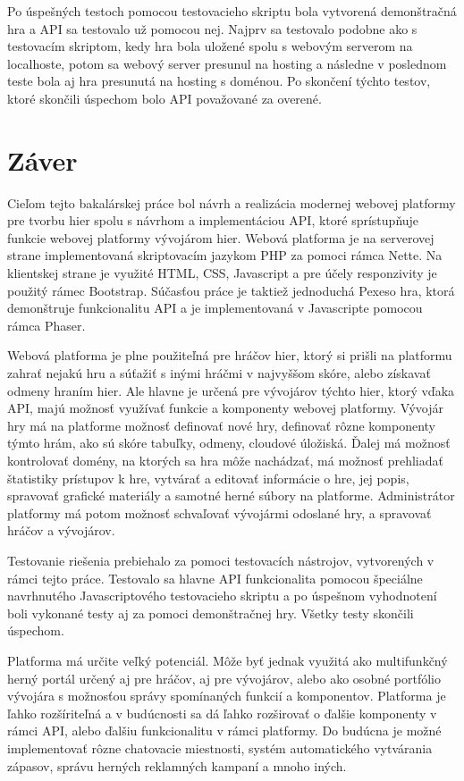 Po úspešných testoch pomocou testovacieho skriptu bola vytvorená demonštračná hra a API sa testovalo už pomocou nej. Najprv sa testovalo podobne ako s testovacím skriptom, kedy hra bola uložené spolu s webovým serverom na localhoste, potom sa webový server presunul na hosting a následne v poslednom teste bola aj hra presunutá na hosting s doménou. Po skončení týchto testov, ktoré skončili úspechom bolo API považované za overené. 

\chapter{Záver}
\label{chap:zaver}
Cieľom tejto bakalárskej práce bol návrh a realizácia modernej webovej platformy pre tvorbu hier spolu s návrhom a implementáciou API, ktoré sprístupňuje funkcie webovej platformy vývojárom hier. Webová platforma je na serverovej strane implementovaná skriptovacím jazykom PHP za pomoci rámca Nette. Na klientskej strane je využité HTML, CSS, Javascript a pre účely responzivity je použitý rámec Bootstrap. Súčasťou práce je taktiež jednoduchá Pexeso hra, ktorá demonštruje funkcionalitu API a je implementovaná v Javascripte pomocou rámca Phaser. 

Webová platforma je plne použiteľná pre hráčov hier, ktorý si prišli na platformu zahrať nejakú hru a súťažiť s inými hráčmi v najvyššom skóre, alebo získavať odmeny hraním hier. Ale hlavne je určená pre vývojárov týchto hier, ktorý vďaka API, majú možnosť využívať funkcie a komponenty webovej platformy. Vývojár hry má na platforme možnosť definovať nové hry, definovať rôzne komponenty týmto hrám, ako sú skóre tabuľky, odmeny, cloudové úložiská. Ďalej má možnosť kontrolovať domény, na ktorých sa hra môže nachádzať, má možnosť prehliadať štatistiky prístupov k hre, vytvárať a editovať informácie o hre, jej popis, spravovať grafické materiály a samotné herné súbory na platforme.  Administrátor platformy má potom možnosť schvaľovať vývojármi odoslané hry, a spravovať hráčov a vývojárov. 

Testovanie riešenia prebiehalo za pomoci testovacích nástrojov, vytvorených v rámci tejto práce. Testovalo sa hlavne API funkcionalita pomocou špeciálne navrhnutého Javascriptového testovacieho skriptu a po úspešnom vyhodnotení boli vykonané testy aj za pomoci demonštračnej hry. Všetky testy skončili úspechom.  

Platforma má určite veľký potenciál. Môže byť jednak využitá ako multifunkčný herný portál určený aj pre hráčov, aj pre vývojárov, alebo ako osobné portfólio vývojára s možnosťou správy spomínaných funkcií a komponentov. Platforma je ľahko rozšíriteľná a v budúcnosti sa dá ľahko rozširovať o ďalšie komponenty v rámci API, alebo ďalšiu funkcionalitu v rámci platformy. Do budúcna je možné implementovať rôzne chatovacie miestnosti, systém automatického vytvárania zápasov, správu herných reklamných kampaní a mnoho iných. 















